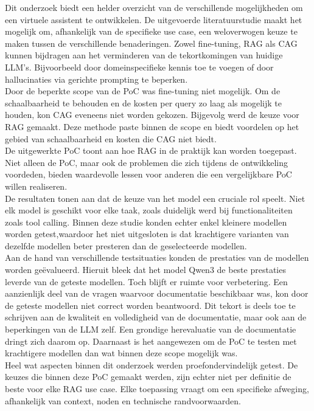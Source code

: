Dit onderzoek biedt een helder overzicht van de verschillende mogelijkheden om een virtuele assistent te ontwikkelen. De uitgevoerde literatuurstudie maakt het mogelijk om, afhankelijk van de specifieke use case, een weloverwogen keuze te maken tussen de verschillende benaderingen. Zowel fine-tuning, RAG als CAG kunnen bijdragen aan het verminderen van de tekortkomingen van huidige LLM's. Bijvoorbeeld door domeinspecifieke kennis toe te voegen of door hallucinaties via gerichte prompting te beperken.
\\[1em]
Door de beperkte scope van de PoC was fine-tuning niet mogelijk. Om de schaalbaarheid te behouden en de kosten per query zo laag als mogelijk te houden, kon CAG eveneens niet worden gekozen. Bijgevolg werd de keuze voor RAG gemaakt. Deze methode paste binnen de scope en biedt voordelen op het gebied van schaalbaarheid en kosten die CAG niet biedt.
\\[1em]
De uitgewerkte PoC toont aan hoe RAG in de praktijk kan worden toegepast. Niet alleen de PoC, maar ook de problemen die zich tijdens de ontwikkeling voordeden, bieden waardevolle lessen voor anderen die een vergelijkbare PoC willen realiseren.
\\[1em]
De resultaten tonen aan dat de keuze van het model een cruciale rol speelt. Niet elk model is geschikt voor elke taak, zoals duidelijk werd bij functionaliteiten zoals tool calling. Binnen deze studie konden echter enkel kleinere modellen worden getest,waardoor het niet uitgesloten is dat krachtigere varianten van dezelfde modellen beter presteren dan de geselecteerde modellen.
\\[1em]
Aan de hand van verschillende testsituaties konden de prestaties van de modellen worden geëvalueerd. Hieruit bleek dat het model Qwen3 de beste prestaties leverde van de geteste modellen. Toch blijft er ruimte voor verbetering. Een aanzienlijk deel van de vragen waarvoor documentatie beschikbaar was, kon door de geteste modellen niet correct worden beantwoord. Dit tekort is deels toe te schrijven aan de kwaliteit en volledigheid van de documentatie, maar ook aan de beperkingen van de LLM zelf. Een grondige herevaluatie van de documentatie dringt zich daarom op. Daarnaast is het aangewezen om de PoC te testen met krachtigere modellen dan wat binnen deze scope mogelijk was.
\\[1em]
Heel wat aspecten binnen dit onderzoek werden proefondervindelijk getest. De keuzes die binnen deze PoC gemaakt werden, zijn echter niet per definitie de beste voor elke RAG use case. Elke toepassing vraagt om een specifieke afweging, afhankelijk van context, noden en technische randvoorwaarden.
